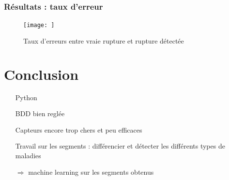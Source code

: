 \documentclass{beamer}
\begin{document}
\begin{frame}
	\frametitle{Résultats : taux d'erreur}
	\begin{figure}
		\texttt{[image: ]}
		\caption{Taux d'erreurs entre vraie rupture et rupture détectée}
	\end{figure}
\end{frame}

\section{Conclusion}

\begin{frame}

\begin{itemize}

	\item[Python]
	
	\item[BDD] bien reglée
	
	\item[Capteurs] encore trop chers et peu efficaces
	
	\vspace*{1cm}
	\item[Travail] sur les segments : différencier et détecter les différents types de maladies
	\item[$\Longrightarrow$] machine learning sur les segments obtenus
	\vspace*{1cm}

\end{itemize}

\end{frame}
\end{document}
